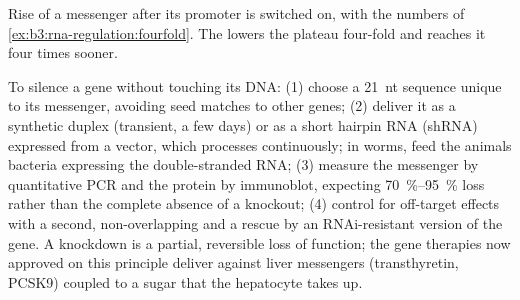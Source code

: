 \begin{omfigure}

{\small Rise of a messenger after its promoter is switched on, with the
numbers of \cref{ex:b3:rna-regulation:fourfold}. The  lowers the
plateau four-fold and reaches it four times sooner.}
\end{omfigure}

\begin{method}\label{met:b3:rna-regulation:knockdown}
To silence a gene without touching its DNA: (1) choose a
\qty{21}{nt} sequence unique to its messenger, avoiding seed matches to
other genes; (2) deliver it as a synthetic  duplex (transient, a
few days) or as a short hairpin RNA (shRNA) expressed from a vector,
which  processes continuously; in worms, feed the animals bacteria
expressing the double-stranded RNA; (3) measure the messenger by
quantitative PCR and the protein by immunoblot, expecting
\qtyrange{70}{95}{\%} loss rather than the complete absence of a
knockout; (4) control for off-target effects with a second,
non-overlapping  and a rescue by an RNAi-resistant version of the
gene. A knockdown is a partial, reversible loss of function; the gene
therapies now approved on this principle deliver  against liver
messengers (transthyretin, PCSK9) coupled to a sugar that the
hepatocyte takes up.
\end{method}

